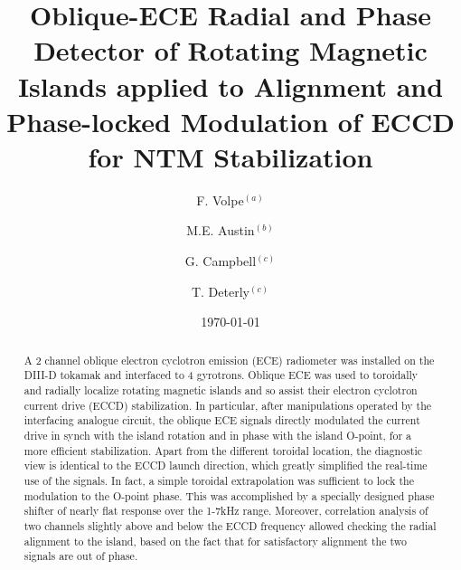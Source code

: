\documentclass[aps,pra,twocolumn]{revtex4}
\begin{document}
\title{Oblique-ECE Radial and Phase Detector of Rotating Magnetic Islands  
applied to Alignment and Phase-locked Modulation of ECCD for NTM 
Stabilization}


\author{F. Volpe$^{(a)}$}
\author{M.E. Austin$^{(b)}$}
\author{G. Campbell$^{(c)}$}
\author{T. Deterly$^{(c)}$}



\date{\today}

\begin{abstract}
A 2 channel oblique electron cyclotron emission (ECE) radiometer was 
installed on the DIII-D tokamak and interfaced to 4 gyrotrons. 
Oblique ECE was used to 
toroidally and radially localize rotating magnetic islands and so assist 
their electron cyclotron current drive (ECCD) stabilization. 
In particular, after manipulations operated by the interfacing analogue 
circuit, the oblique ECE signals directly modulated the current drive in 
synch with the island rotation and in phase with the island O-point, 
for a more efficient stabilization. 
Apart from the different toroidal location, 
the diagnostic view is identical to the ECCD launch direction,
which greatly simplified the real-time use of the signals. In fact, 
a simple toroidal extrapolation was sufficient to lock the modulation 
to the O-point phase. This was accomplished by a specially designed 
phase shifter of nearly flat response over the 1-7kHz range. 
Moreover, correlation
analysis of two channels slightly above and below the ECCD frequency allowed  
checking the radial alignment to the island, based on the fact that for
satisfactory alignment the two signals are out of phase. 
\end{abstract}
\end{document}
